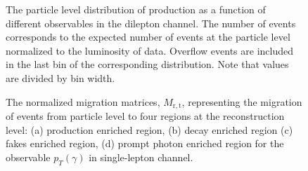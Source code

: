\begin{figure}[ht]
    \caption{The particle level distribution of \tty production as a function of different observables in the dilepton channel. The number of events corresponds to the expected number of events at the particle level normalized to the luminosity of data. Overflow events are included in the last bin of the corresponding distribution. Note that values are divided by bin width.}
    \label{fig:folding_input_dilep1}
\end{figure}
\FloatBarrier


\begin{figure}[ht]
    \centering
    \quad\quad
    \quad\quad
    \quad\quad
    \quad\quad
    \caption{The normalized migration matrices, $M_{\mathrm{r,t}}$, representing the migration of events from particle level to four regions at the reconstruction level: (a) \tty production enriched region, (b) \tty decay enriched region (c) fakes enriched region, (d) prompt photon enriched region for the observable $p_T(\gamma)$ in single-lepton channel.}
    \label{fig:folding_input_migration_ljet}
\end{figure}
\FloatBarrier

